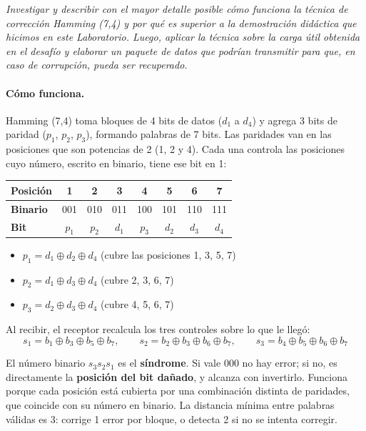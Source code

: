 \documentclass[11pt,a4paper]{article}
\begin{document}
\textit{Investigar y describir con el mayor detalle posible cómo funciona la técnica de corrección Hamming (7,4) y por qué es superior a la demostración didáctica que hicimos en este Laboratorio. Luego, aplicar la técnica sobre la carga útil obtenida en el desafío y elaborar un paquete de datos que podrían transmitir para que, en caso de corrupción, pueda ser recuperado.}

\medskip

\paragraph{Cómo funciona.} Hamming (7,4) toma bloques de 4 bits de datos ($d_1$ a $d_4$) y agrega 3 bits de paridad ($p_1$, $p_2$, $p_3$), formando palabras de 7 bits. Las paridades van en las posiciones que son potencias de 2 (1, 2 y 4). Cada una controla las posiciones cuyo número, escrito en binario, tiene ese bit en 1:

\begin{center}
\begin{tabular}{|l|c|c|c|c|c|c|c|}
\hline
\textbf{Posición} & 1 & 2 & 3 & 4 & 5 & 6 & 7 \\
\hline
\textbf{Binario} & 001 & 010 & 011 & 100 & 101 & 110 & 111 \\
\textbf{Bit} & $p_1$ & $p_2$ & $d_1$ & $p_3$ & $d_2$ & $d_3$ & $d_4$ \\
\hline
\end{tabular}
\end{center}

\begin{itemize}
  \item $p_1 = d_1 \oplus d_2 \oplus d_4$ (cubre las posiciones 1, 3, 5, 7)
  \item $p_2 = d_1 \oplus d_3 \oplus d_4$ (cubre 2, 3, 6, 7)
  \item $p_3 = d_2 \oplus d_3 \oplus d_4$ (cubre 4, 5, 6, 7)
\end{itemize}

Al recibir, el receptor recalcula los tres controles sobre lo que le llegó:
\[
s_1 = b_1 \oplus b_3 \oplus b_5 \oplus b_7, \qquad
s_2 = b_2 \oplus b_3 \oplus b_6 \oplus b_7, \qquad
s_3 = b_4 \oplus b_5 \oplus b_6 \oplus b_7
\]

El número binario $s_3 s_2 s_1$ es el \textbf{síndrome}. Si vale $000$ no hay error; si no, es directamente la \textbf{posición del bit dañado}, y alcanza con invertirlo. Funciona porque cada posición está cubierta por una combinación distinta de paridades, que coincide con su número en binario. La distancia mínima entre palabras válidas es 3: corrige 1 error por bloque, o detecta 2 si no se intenta corregir.
\end{document}
